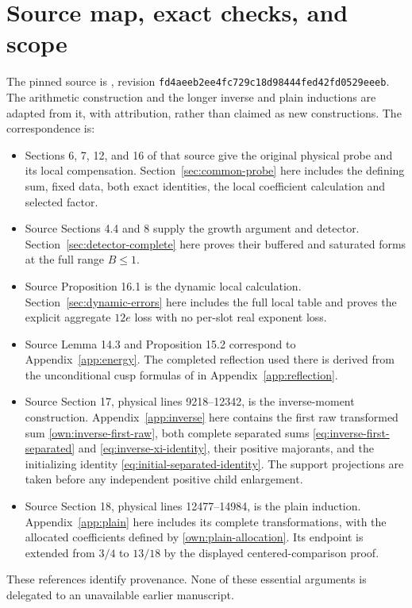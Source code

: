 \documentclass[12pt]{article}
\begin{document}
\section{Source map, exact checks, and scope}\label{app:checks}
The pinned source is \cite{QRH}, revision
\nolinkurl{fd4aeeb2ee4fc729c18d98444fed42fd0529eeeb}.
The arithmetic construction and the longer inverse and plain
inductions are adapted from it, with attribution, rather than
claimed as new constructions.  The correspondence is:
\begin{itemize}
\item Sections 6, 7, 12, and 16 of that source give the original
physical probe and its local compensation.  Section~\ref{sec:common-probe}
here includes the defining sum, fixed data, both exact identities,
the local coefficient calculation and selected factor.
\item Source Sections 4.4 and 8 supply the growth argument and
detector.  Section~\ref{sec:detector-complete} here proves their
buffered and saturated forms at the full range \(B\le1\).
\item Source Proposition 16.1 is the dynamic local calculation.
Section~\ref{sec:dynamic-errors} here includes the full local table
and proves the explicit aggregate \(12e\) loss with no per-slot
real exponent loss.
\item Source Lemma 14.3 and Proposition 15.2 correspond to
Appendix~\ref{app:energy}.  The completed reflection used there
is derived from the unconditional cusp formulas of \cite{DR} in
Appendix~\ref{app:reflection}.
\item Source Section 17, physical lines 9218--12342, is the
inverse-moment construction.  Appendix~\ref{app:inverse} here
contains the first raw transformed sum
\eqref{own:inverse-first-raw}, both complete separated sums
\eqref{eq:inverse-first-separated} and
\eqref{eq:inverse-xi-identity}, their positive majorants, and the
initializing identity \eqref{eq:initial-separated-identity}.
The support projections are taken before any independent positive
child enlargement.
\item Source Section 18, physical lines 12477--14984, is the
plain induction.  Appendix~\ref{app:plain} here includes its
complete transformations, with the allocated coefficients defined
by \eqref{own:plain-allocation}.  Its endpoint is extended from
\(3/4\) to \(13/18\) by the displayed centered-comparison proof.
\end{itemize}
These references identify provenance.  None of these essential
arguments is delegated to an unavailable earlier manuscript.
\end{document}

